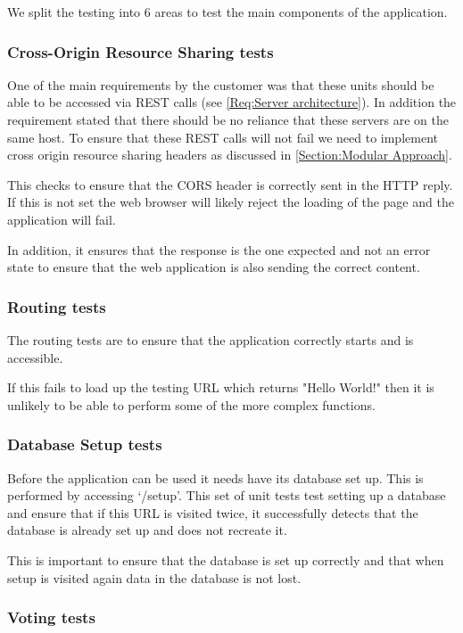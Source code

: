 We split the testing into 6 areas to test the main components of the application.

\subsubsection{Cross-Origin Resource Sharing tests}

One of the main requirements by the customer was that these units should be able to be accessed via REST calls (see \cref{Req:Server architecture}). In addition the requirement stated that there should be no reliance that these servers are on the same host. To ensure that these REST calls will not fail we need to implement cross origin resource sharing headers as discussed in \autoref{Section:Modular Approach}.

This checks to ensure that the CORS header is correctly sent in the HTTP reply. If this is not set the web browser will likely reject the loading of the page and the application will fail.

In addition, it ensures that the response is the one expected and not an error state to ensure that the web application is also sending the correct content.

\subsubsection{Routing tests}

The routing tests are to ensure that the application correctly starts and is accessible.

If this fails to load up the testing URL which returns "Hello World!" then it is unlikely to be able to perform some of the more complex functions.

\subsubsection{Database Setup tests}

Before the application can be used it needs have its database set up. This is performed by accessing `/setup'. This set of unit tests test setting up a database and ensure that if this URL is visited twice, it successfully detects that the database is already set up and does not recreate it. 

This is important to ensure that the database is set up correctly and that when setup is visited again data in the database is not lost.

\subsubsection{Voting tests}

